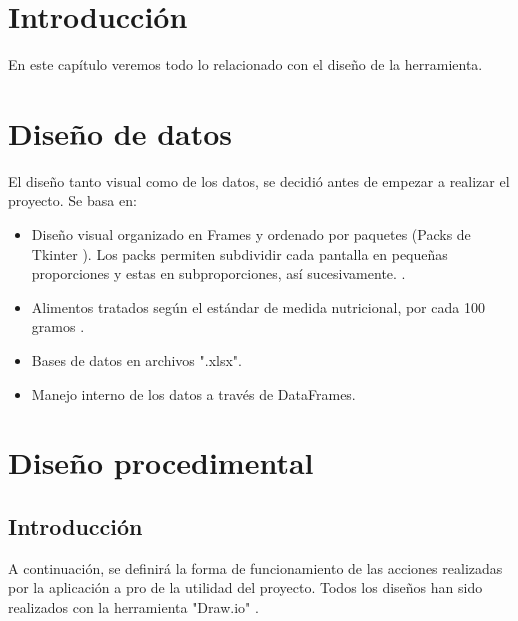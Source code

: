 
\section{Introducción}
En este capítulo veremos  todo lo relacionado con el diseño de la herramienta.
\section{Diseño de datos}
El diseño tanto visual como de los datos, se decidió antes de empezar a realizar el proyecto. Se basa en:
\begin{itemize}
\item Diseño visual organizado en Frames y ordenado por paquetes (Packs de Tkinter \cite{pack}). Los packs permiten subdividir cada pantalla en pequeñas proporciones y estas en subproporciones, así sucesivamente. .
\item Alimentos tratados según el estándar de medida nutricional, por cada 100 gramos \cite{estandarNutri}.
\item Bases de datos en archivos ".xlsx".
\item Manejo interno de los datos a través de DataFrames.
\end{itemize}
\section{Diseño procedimental}
\subsection{Introducción}
A continuación, se definirá la forma de funcionamiento de las acciones realizadas por la aplicación a pro de la utilidad del proyecto. Todos los diseños han sido realizados con la herramienta "Draw.io" \cite{herramientoUML}.
